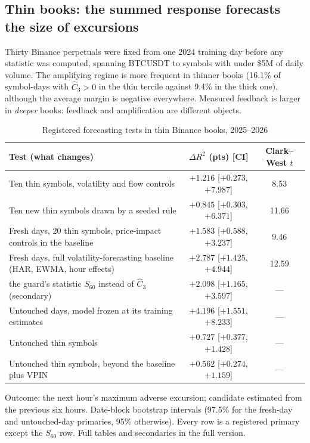     \subsection{Thin books: the summed response forecasts the size of excursions}\label{p2:sec:thin}

    Thirty Binance perpetuals were fixed from one 2024 training day before any statistic was computed, spanning BTCUSDT to symbols with under \$5M of daily volume. The amplifying regime is more frequent in thinner books (16.1\% of symbol-days with $\hat C_3>0$ in the thin tercile against 9.4\% in the thick one), although the average margin is negative everywhere. Measured feedback is larger in \emph{deeper} books: feedback and amplification are different objects.

    \begin{table}[t]\centering\small
    \begin{threeparttable}
    \caption{Registered forecasting tests in thin Binance books, 2025--2026}\label{p2:tab:thin}
    \setlength{\tabcolsep}{3pt}
    \begin{tabular}{p{}cc}
    \toprule
    Test (what changes) & $\Delta R^2$ (pts) [CI] & Clark--West $t$\\
    \midrule
    Ten thin symbols, volatility and flow controls & $+1.216$ [$+0.273$, $+7.987$] & 8.53\\
    Ten new thin symbols drawn by a seeded rule & $+0.845$ [$+0.303$, $+6.371$] & 11.66\\
    Fresh days, 20 thin symbols, price-impact controls in the baseline & $+1.583$ [$+0.588$, $+3.237$] & 9.46\\
    Fresh days, full volatility-forecasting baseline (HAR, EWMA, hour effects) & $+2.787$ [$+1.425$, $+4.944$] & 12.59\\
    \quad the guard's statistic $S_{60}$ instead of $\hat C_3$ (secondary) & $+2.098$ [$+1.165$, $+3.597$] & ---\\
    Untouched days, model frozen at its training estimates & $+4.196$ [$+1.551$, $+8.233$] & ---\\
    Untouched thin symbols & $+0.727$ [$+0.377$, $+1.428$] & ---\\
    Untouched thin symbols, beyond the baseline plus VPIN & $+0.562$ [$+0.274$, $+1.159$] & ---\\
    \bottomrule
    \end{tabular}
    \begin{tablenotes}\footnotesize\item Outcome: the next hour's maximum adverse excursion; candidate estimated from the previous six hours. Date-block bootstrap intervals (97.5\% for the fresh-day and untouched-day primaries, 95\% otherwise). Every row is a registered primary except the $S_{60}$ row. Full tables and secondaries in the full version.\end{tablenotes}
    \end{threeparttable}
    \end{table}

